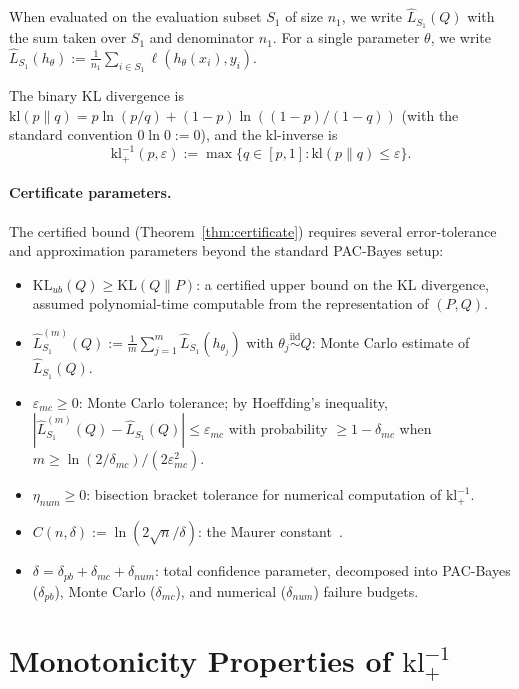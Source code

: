 \documentclass[11pt,a4paper]{article}
\newcommand{\kl}{\mathrm{kl}}
\newcommand{\KL}{\mathrm{KL}}
\newcommand{\klinv}{\kl^{-1}_+}
\begin{document}
When evaluated on the evaluation subset $S_1$ of size $n_1$, we write $\hat{L}_{S_1}(Q)$ with the sum taken over $S_1$ and denominator $n_1$. For a single parameter $\theta$, we write $\hat{L}_{S_1}(h_\theta) := \frac{1}{n_1}\sum_{i \in S_1} \ell(h_\theta(x_i), y_i)$.

The binary KL divergence is $\kl(p\|q) = p \ln(p/q) + (1-p)\ln((1-p)/(1-q))$ (with the standard convention $0 \ln 0 := 0$), and the kl-inverse is
\[
\klinv(p, \varepsilon) := \max\{q \in [p, 1] : \kl(p\|q) \le \varepsilon\}.
\]

\paragraph{Certificate parameters.}
The certified bound (Theorem~\ref{thm:certificate}) requires several error-tolerance and approximation parameters beyond the standard PAC-Bayes setup:
\begin{itemize}
    \item $\KL_{ub}(Q) \ge \KL(Q\|P)$: a certified upper bound on the KL divergence, assumed polynomial-time computable from the representation of $(P,Q)$.
    \item $\hat{L}_{S_1}^{(m)}(Q) := \frac{1}{m}\sum_{j=1}^m \hat{L}_{S_1}(h_{\theta_j})$ with $\theta_j \stackrel{\mathrm{iid}}{\sim} Q$: Monte Carlo estimate of $\hat{L}_{S_1}(Q)$.
    \item $\varepsilon_{mc} \ge 0$: Monte Carlo tolerance; by Hoeffding's inequality, $|\hat{L}_{S_1}^{(m)}(Q) - \hat{L}_{S_1}(Q)| \le \varepsilon_{mc}$ with probability $\ge 1 - \delta_{mc}$ when $m \ge \ln(2/\delta_{mc})/(2\varepsilon_{mc}^2)$.
    \item $\eta_{num} \ge 0$: bisection bracket tolerance for numerical computation of $\klinv$.
    \item $C(n,\delta) := \ln(2\sqrt{n}/\delta)$: the Maurer constant~\cite{maurer2004}.
    \item $\delta = \delta_{pb} + \delta_{mc} + \delta_{num}$: total confidence parameter, decomposed into PAC-Bayes ($\delta_{pb}$), Monte Carlo ($\delta_{mc}$), and numerical ($\delta_{num}$) failure budgets.
\end{itemize}

\section{Monotonicity Properties of $\klinv$}
\end{document}
